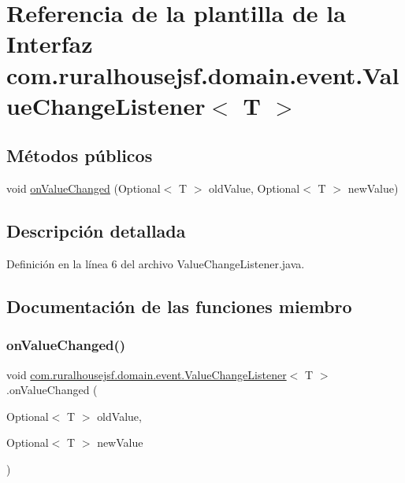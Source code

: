 \hypertarget{interfacecom_1_1ruralhousejsf_1_1domain_1_1event_1_1_value_change_listener}{}\section{Referencia de la plantilla de la Interfaz com.\+ruralhousejsf.\+domain.\+event.\+Value\+Change\+Listener$<$ T $>$}
\label{interfacecom_1_1ruralhousejsf_1_1domain_1_1event_1_1_value_change_listener}
\subsection*{Métodos públicos}
\begin{DoxyCompactItemize}
\item 
void \mbox{\hyperlink{interfacecom_1_1ruralhousejsf_1_1domain_1_1event_1_1_value_change_listener_a415b70f14683821f1674cd6bb1293904}{on\+Value\+Changed}} (Optional$<$ T $>$ old\+Value, Optional$<$ T $>$ new\+Value)
\end{DoxyCompactItemize}


\subsection{Descripción detallada}


Definición en la línea 6 del archivo Value\+Change\+Listener.\+java.



\subsection{Documentación de las funciones miembro}
\mbox{\label{interfacecom_1_1ruralhousejsf_1_1domain_1_1event_1_1_value_change_listener_a415b70f14683821f1674cd6bb1293904}} 
\subsubsection{\texorpdfstring{onValueChanged()}{onValueChanged()}}
{\footnotesize\ttfamily void \mbox{\hyperlink{interfacecom_1_1ruralhousejsf_1_1domain_1_1event_1_1_value_change_listener}{com.\+ruralhousejsf.\+domain.\+event.\+Value\+Change\+Listener}}$<$ T $>$.on\+Value\+Changed (\begin{DoxyParamCaption}\item[{Optional$<$ T $>$}]{old\+Value,  }\item[{Optional$<$ T $>$}]{new\+Value }\end{DoxyParamCaption})}



